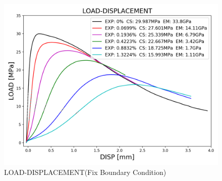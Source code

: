 \begin{figure}[ht!]
    \centering
    \includegraphics[width=0.8\linewidth]{Files/exp_3D/ASR/S13A30P75FIX-LOAD-DISPLACEMENT.png}
    \caption{LOAD-DISPLACEMENT(Fix Boundary Condition)}
    \label{fig:S13A30P75FIX-LOAD-DISPLACEMENT}
\end{figure}

